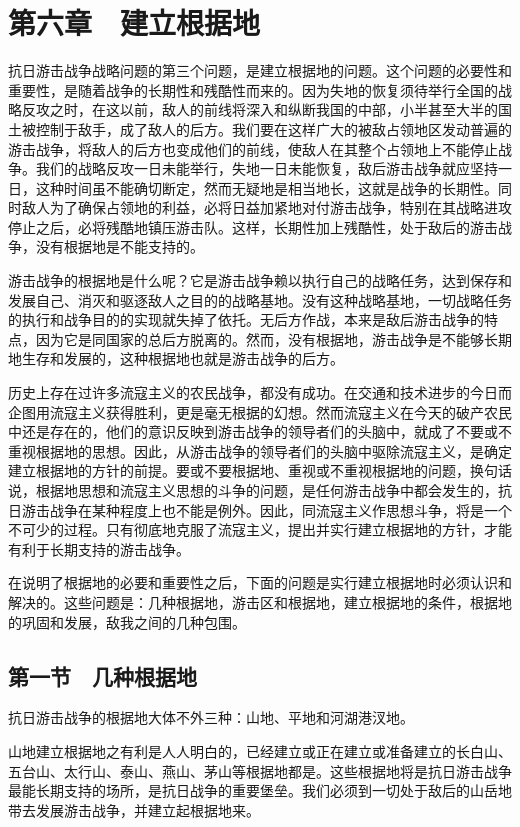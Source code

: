 \section{第六章　建立根据地}

抗日游击战争战略问题的第三个问题，是建立根据地的问题。这个问题的必要性和重要性，是随着战争的长期性和残酷性而来的。因为失地的恢复须待举行全国的战略反攻之时，在这以前，敌人的前线将深入和纵断我国的中部，小半甚至大半的国土被控制于敌手，成了敌人的后方。我们要在这样广大的被敌占领地区发动普遍的游击战争，将敌人的后方也变成他们的前线，使敌人在其整个占领地上不能停止战争。我们的战略反攻一日未能举行，失地一日未能恢复，敌后游击战争就应坚持一日，这种时间虽不能确切断定，然而无疑地是相当地长，这就是战争的长期性。同时敌人为了确保占领地的利益，必将日益加紧地对付游击战争，特别在其战略进攻停止之后，必将残酷地镇压游击队。这样，长期性加上残酷性，处于敌后的游击战争，没有根据地是不能支持的。

游击战争的根据地是什么呢？它是游击战争赖以执行自己的战略任务，达到保存和发展自己、消灭和驱逐敌人之目的的战略基地。没有这种战略基地，一切战略任务的执行和战争目的的实现就失掉了依托。无后方作战，本来是敌后游击战争的特点，因为它是同国家的总后方脱离的。然而，没有根据地，游击战争是不能够长期地生存和发展的，这种根据地也就是游击战争的后方。

历史上存在过许多流寇主义的农民战争，都没有成功。在交通和技术进步的今日而企图用流寇主义获得胜利，更是毫无根据的幻想。然而流寇主义在今天的破产农民中还是存在的，他们的意识反映到游击战争的领导者们的头脑中，就成了不要或不重视根据地的思想。因此，从游击战争的领导者们的头脑中驱除流寇主义，是确定建立根据地的方针的前提。要或不要根据地、重视或不重视根据地的问题，换句话说，根据地思想和流寇主义思想的斗争的问题，是任何游击战争中都会发生的，抗日游击战争在某种程度上也不能是例外。因此，同流寇主义作思想斗争，将是一个不可少的过程。只有彻底地克服了流寇主义，提出并实行建立根据地的方针，才能有利于长期支持的游击战争。

在说明了根据地的必要和重要性之后，下面的问题是实行建立根据地时必须认识和解决的。这些问题是：几种根据地，游击区和根据地，建立根据地的条件，根据地的巩固和发展，敌我之间的几种包围。

\subsection{第一节　几种根据地}

抗日游击战争的根据地大体不外三种：山地、平地和河湖港汊地。

山地建立根据地之有利是人人明白的，已经建立或正在建立或准备建立的长白山、五台山、太行山、泰山、燕山、茅山等根据地都是。这些根据地将是抗日游击战争最能长期支持的场所，是抗日战争的重要堡垒。我们必须到一切处于敌后的山岳地带去发展游击战争，并建立起根据地来。


